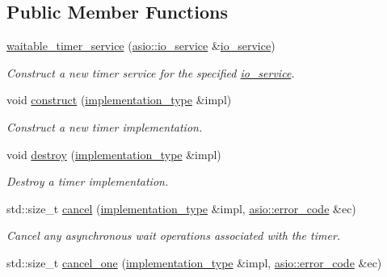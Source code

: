 \subsection*{Public Member Functions}
\begin{DoxyCompactItemize}
\item 
\hyperlink{classasio_1_1waitable__timer__service_a9ca255ce40df3dab3047eaff2df3b487}{waitable\+\_\+timer\+\_\+service} (\hyperlink{classasio_1_1io__service}{asio\+::io\+\_\+service} \&\hyperlink{classasio_1_1io__service}{io\+\_\+service})
\begin{DoxyCompactList}\small\item\em Construct a new timer service for the specified \hyperlink{classasio_1_1io__service}{io\+\_\+service}. \end{DoxyCompactList}\item 
void \hyperlink{classasio_1_1waitable__timer__service_a3a7855c8eb1ddb9426e01a9c28b1737a}{construct} (\hyperlink{classasio_1_1waitable__timer__service_a397aa07a3c8f707a307b83a9616ed44e}{implementation\+\_\+type} \&impl)
\begin{DoxyCompactList}\small\item\em Construct a new timer implementation. \end{DoxyCompactList}\item 
void \hyperlink{classasio_1_1waitable__timer__service_a3e09576969dc6a4512d19f536df92fc8}{destroy} (\hyperlink{classasio_1_1waitable__timer__service_a397aa07a3c8f707a307b83a9616ed44e}{implementation\+\_\+type} \&impl)
\begin{DoxyCompactList}\small\item\em Destroy a timer implementation. \end{DoxyCompactList}\item 
std\+::size\+\_\+t \hyperlink{classasio_1_1waitable__timer__service_a90a777e6ee642bff470cf798755248af}{cancel} (\hyperlink{classasio_1_1waitable__timer__service_a397aa07a3c8f707a307b83a9616ed44e}{implementation\+\_\+type} \&impl, \hyperlink{classasio_1_1error__code}{asio\+::error\+\_\+code} \&ec)
\begin{DoxyCompactList}\small\item\em Cancel any asynchronous wait operations associated with the timer. \end{DoxyCompactList}\item 
std\+::size\+\_\+t \hyperlink{classasio_1_1waitable__timer__service_a5373a94d126d2337485a1e09717a7b51}{cancel\+\_\+one} (\hyperlink{classasio_1_1waitable__timer__service_a397aa07a3c8f707a307b83a9616ed44e}{implementation\+\_\+type} \&impl, \hyperlink{classasio_1_1error__code}{asio\+::error\+\_\+code} \&ec)

\end{DoxyCompactItemize}
